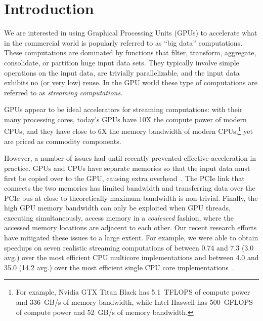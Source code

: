 \section{Introduction}
We are interested in using Graphical Processing Units (GPUs) to accelerate what in the commercial world is popularly
referred to as ``big data'' computations.
These computations are dominated by functions that filter, transform, aggregate, consolidate, or
partition huge input data sets.
They typically involve simple operations on the input data, are trivially parallelizable, and the
input data exhibits no (or very low) reuse.
In the GPU world these type of computations are referred to as \emph{streaming computations}.

GPUs appear to be ideal accelerators for streaming computations: with their many
processing cores, today's GPUs have 10X the compute power of modern CPUs, and they have close to 6X
the memory bandwidth of modern CPUs,\footnote{
	For example, Nvidia GTX Titan Black has 5.1~TFLOPS of compute power and 336~GB/s of memory
	bandwidth, while Intel Haswell has 500~GFLOPS of compute power and 52~GB/s of
	memory bandwidth.}
yet are priced as commodity components.

However, a number of issues had until recently prevented effective acceleration in practice.
GPUs and CPUs have separate memories so that the input data must first be copied over to the GPU,
causing extra overhead~\cite{gregg2011data}.
The PCIe link that connects the two memories has limited bandwidth and transferring data over
the PCIe bus at close to theoretically maximum bandwidth is non-trivial. 
Finally, the high GPU memory bandwidth can only be exploited when GPU threads, executing simultaneously,
access memory in a \emph{coalesced} fashion, where the accessed memory
locations are adjacent to each other.
Our recent research efforts have mitigated these issues to a large extent.
For example, we were able to obtain speedups on seven realistic streaming computations of between 0.74 and
7.3 (3.0 avg.) over the most efficient CPU multicore implementations and between 4.0 and 35.0 (14.2 avg.) over the most
efficient single CPU core implementations~\cite{mokhtari2014bigkernel}.

